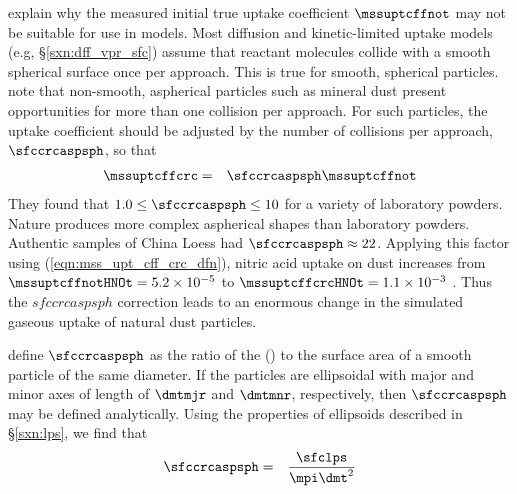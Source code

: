 \documentclass[12pt,twoside]{book}
\begin{document}
\cite{USP01} explain why the measured initial true uptake coefficient
$\mssuptcffnot$ may not be suitable for use in models.
Most diffusion and kinetic-limited uptake models (e.g,
\S\ref{sxn:dff_vpr_sfc}) assume that reactant molecules collide with a
smooth spherical surface once per approach.
This is true for smooth, spherical particles.
\citeauthor{USP01} note that non-smooth, aspherical particles such as
mineral dust present opportunities for more than one collision per
approach.
For such particles, the uptake coefficient should be adjusted by the
number of collisions per approach, $\sfccrcaspsph$, so that
\begin{eqnarray}
\mssuptcffcrc & = & \sfccrcaspsph \mssuptcffnot
\label{eqn:mss_upt_cff_crc_dfn}
\end{eqnarray}
They found that $1.0 \le \sfccrcaspsph \le 10$ for a variety of
laboratory powders.
Nature produces more complex aspherical shapes than laboratory
powders.
Authentic samples of China Loess had $\sfccrcaspsph \approx 22$.
Applying this factor using (\ref{eqn:mss_upt_cff_crc_dfn}), nitric
acid uptake on dust increases from 
$\mssuptcffnotHNOt = 5.2 \times 10^{-5}$ to 
$\mssuptcffcrcHNOt = 1.1 \times 10^{-3}$ \cite[]{USP01}.
Thus the $sfccrcaspsph$ correction leads to an enormous change in the
simulated gaseous uptake of natural dust particles.

\cite{USP01} define $\sfccrcaspsph$ as the ratio of the
 () 
to the surface area of a smooth particle of the same diameter. 
If the particles are ellipsoidal with major and minor axes of length
of $\dmtmjr$ and $\dmtmnr$, respectively, then $\sfccrcaspsph$ may be
defined analytically.
Using the properties of ellipsoids described in \S\ref{sxn:lps}, 
we find that 
\begin{eqnarray}
\sfccrcaspsph & = & \frac{\sfclps}{\mpi \dmt^{2}}
\label{eqn:sfc_crc_asp_sph_dfn}
\end{eqnarray}
\end{document}
